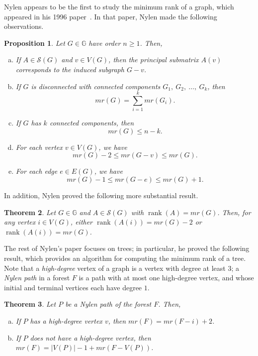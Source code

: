 \documentclass{article}
\newtheorem{theorem}{Theorem}[section]
\newtheorem{proposition}[theorem]{Proposition}
\theoremstyle{definition}
\newcommand\abs[1]{\left|#1\right|}
\newcommand\rank[1]{\operatorname{rank}\left(#1\right)}
\begin{document}
Nylen appears to be the first to study the minimum rank of a graph, which appeared in his 1996 paper~\cite{Nylen1996}.
In that paper, Nylen made the following observations.
\begin{proposition}\label{prop:nylen}
Let $G\in\mathbb{G}$ have order $n\geq 1$.
Then,
\begin{enumerate}[a.]
\item If $A\in\mathcal{S}(G)$ and $v\in V(G)$, then the principal submatrix $A(v)$ corresponds to the induced subgraph $G-v$.
\item If $G$ is disconnected with connected components $G_{1},~G_{2},~\ldots,~G_{k}$, then
\[
mr(G) = \sum_{i=1}^{k}mr(G_{i}).
\]
\item If $G$ has $k$ connected components, then
\[
mr(G) \leq n-k.
\]
\item For each vertex $v\in V(G)$, we have
\[
mr(G) - 2 \leq mr(G-v) \leq mr(G).
\]
\item For each edge $e\in E(G)$, we have
\[
mr(G) - 1 \leq mr(G-e) \leq mr(G) + 1.
\]
\end{enumerate}
\end{proposition}

In addition, Nylen proved the following more substantial result.
\begin{theorem}\label{thm:nylen}
Let $G\in\mathbb{G}$ and $A\in\mathcal{S}(G)$ with $\rank{A} = mr(G)$.
Then, for any vertex $i\in V(G)$, either $\rank{A(i)} = mr(G)-2$ or $\rank{A(i)} = mr(G)$.
\end{theorem}

The rest of Nylen's paper focuses on trees; in particular, he proved the following result, which provides an algorithm for computing the minimum rank of a tree.
Note that a \emph{high-degree} vertex of a graph is a vertex with degree at least $3$; a \emph{Nylen path} in a forest $F$ is a path with at most one high-degree vertex, and whose initial and terminal vertices each have degree $1$.
\begin{theorem}\label{thm:nylen2}
Let $P$ be a Nylen path of the forest $F$.
Then,
\begin{enumerate}[a.]
\item If $P$ has a high-degree vertex $v$, then $mr(F) = mr(F-i)+2$.
\item If $P$ does not have a high-degree vertex, then $mr(F) = \abs{V(P)}-1 + mr(F-V(P))$.
\end{enumerate}
\end{theorem}
\end{document}

